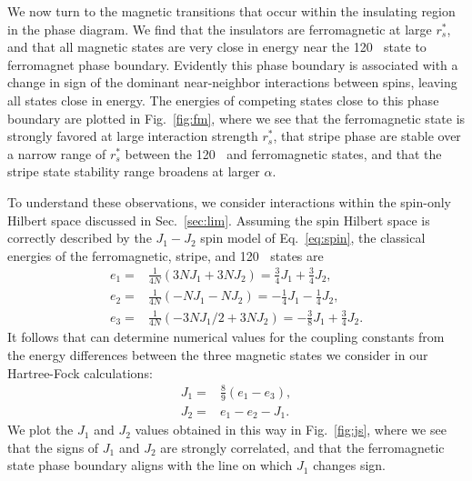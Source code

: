 \documentclass[%
 reprint,
 superscriptaddress,
 amsmath,amssymb,
 aps,
 prx,
 floatfix,
]{revtex4-2}
\newcommand{\<}{\langle}
\renewcommand{\>}{\rangle}
\renewcommand{\(}{\left(}
\renewcommand{\)}{\right)}
\renewcommand{\[}{\left[}
\renewcommand{\]}{\right]}
\DeclareMathOperator{\degree}{^{\circ}}
\begin{document}
We now turn to the magnetic transitions that occur within the insulating
region in the phase diagram.  We find that the insulators are ferromagnetic at 
large $r_s^*$, and that all magnetic states are very close in energy near the 120$\degree$ state to 
ferromagnet phase boundary.  Evidently this phase boundary is associated with a change in sign of the dominant 
near-neighbor interactions between spins, leaving all states close in energy.
The energies of competing states close to this phase boundary are plotted in 
Fig.~\ref{fig:fm}, where we see that the ferromagnetic state is strongly favored 
at large interaction strength $r_s^*$, that stripe phase are stable over a narrow 
range of $r_s^*$ between the 120$\degree$ and ferromagnetic states, and that the 
stripe state stability range broadens at larger $\alpha$. 


To understand these observations, we consider interactions within the spin-only Hilbert space discussed in Sec.~\ref{sec:lim}. 
Assuming the spin Hilbert space is correctly described by the $J_1-J_2$ spin model of Eq.~\eqref{eq:spin}, 
the classical energies of the ferromagnetic, stripe, and 120$\degree$ states are 
\begin{align}
    e_{1} =& \frac{1}{4N}(3NJ_1+3NJ_2) = \frac{3}{4}J_1 + \frac{3}{4}J_2,\\
    e_2 =& \frac{1}{4N}(-NJ_1-NJ_2) = -\frac{1}{4}J_1 - \frac{1}{4}J_2,\\
    e_{3} =& \frac{1}{4N}\(-3NJ_1/2+3NJ_2\) = -\frac{3}{8}J_1 + \frac{3}{4}J_2.
\end{align}
It follows that can determine numerical values for the coupling constants from the energy differences between the 
three magnetic states we consider in our Hartree-Fock calculations:
\begin{align}
    J_1 =& \frac{8}{9}\(e_{1}-e_{3}\),\label{eq:j1}\\
    J_2 =& e_{1}-e_{2}-J_1. \label{eq:j2}
\end{align}
We plot the $J_1$ and $J_2$ values obtained in this way
in Fig.~\ref{fig:js}, where we see that the signs of $J_1$ and $J_2$ are strongly correlated, 
and that the ferromagnetic state phase boundary aligns with the line on which $J_1$ changes sign.
\end{document}
